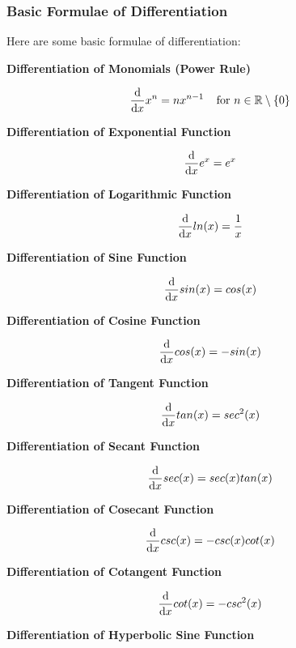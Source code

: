 \documentclass[a4paper,12pt]{article}
\begin{document}
\subsubsection{Basic Formulae of Differentiation}
\begin{thm}
  Here are some basic formulae of differentiation:

  \begin{alist}
    \item \textbf{Differentiation of Monomials (Power Rule)}

    $$\frac{\mathrm{d} }{\mathrm{d}  x}x^{n}=nx^{n-1}\;\;\;\;\text{for }n\in\mathbb{R}\setminus \left\{ 0\right\}$$

    \item \textbf{Differentiation of Exponential Function}

    $$\frac{\mathrm{d} }{\mathrm{d}  x}e^{x}=e^{x}$$

    \item \textbf{Differentiation of Logarithmic Function}

    $$\frac{\mathrm{d} }{\mathrm{d}  x}ln(x)=\frac{1}{x}$$

    \item \textbf{Differentiation of Sine Function}

    $$\frac{\mathrm{d} }{\mathrm{d}  x}sin(x)=cos(x)$$

    \item \textbf{Differentiation of Cosine Function}

    $$\frac{\mathrm{d} }{\mathrm{d}  x}cos(x)=-sin(x)$$

    \item \textbf{Differentiation of Tangent Function}

    $$\frac{\mathrm{d} }{\mathrm{d}  x}tan(x)=sec^{2}(x)$$

    \item \textbf{Differentiation of Secant Function}

    $$\frac{\mathrm{d} }{\mathrm{d}  x}sec(x)=sec(x)tan(x)$$

    \item \textbf{Differentiation of Cosecant Function}

    $$\frac{\mathrm{d} }{\mathrm{d}  x}csc(x)=-csc(x)cot(x)$$

    \item \textbf{Differentiation of Cotangent Function}

    $$\frac{\mathrm{d} }{\mathrm{d}  x}cot(x)=-csc^{2}(x)$$

    \item \textbf{Differentiation of Hyperbolic Sine Function}


\end{alist}
\end{thm}
\end{document}
